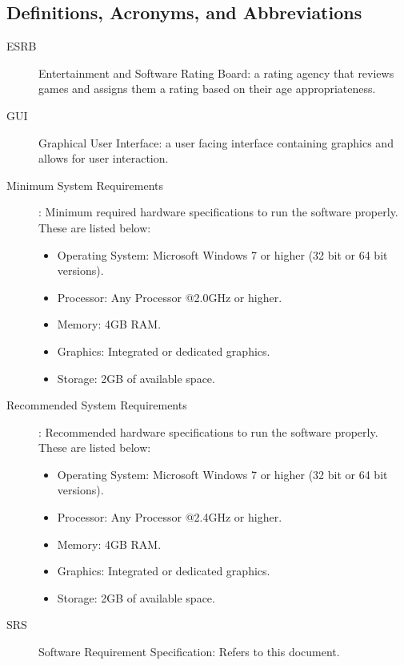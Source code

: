 \documentclass[]{article}
\begin{document}
\subsection{Definitions, Acronyms, and Abbreviations}
\label{sub:definitions_acronyms_and_abbreviations}
\begin{description}
    \item [ESRB] Entertainment and Software Rating Board: a rating agency that reviews games and assigns them a rating based on their age appropriateness.
    \item [GUI] Graphical User Interface: a user facing interface containing graphics and allows for user interaction.
    \item [Minimum System Requirements]: Minimum required hardware specifications to run the software properly. These are listed below:
    \begin{itemize}
        \item Operating System: Microsoft Windows 7 or higher (32 bit or 64 bit versions). 
        \item Processor: Any Processor @2.0GHz or higher.
        \item Memory: 4GB RAM.
        \item Graphics: Integrated or dedicated graphics. 
        \item Storage: 2GB of available space.
    \end{itemize}
    \item [Recommended System Requirements]: Recommended hardware specifications to run the software properly. These are listed below: 
        \begin{itemize}
        \item Operating System: Microsoft Windows 7 or higher (32 bit or 64 bit versions). 
        \item Processor: Any Processor @2.4GHz or higher.
        \item Memory: 4GB RAM.
        \item Graphics: Integrated or dedicated graphics.
        \item Storage: 2GB of available space.
    \end{itemize}
    \item [SRS] Software Requirement Specification: Refers to this document.
\end{description}
\end{document}
